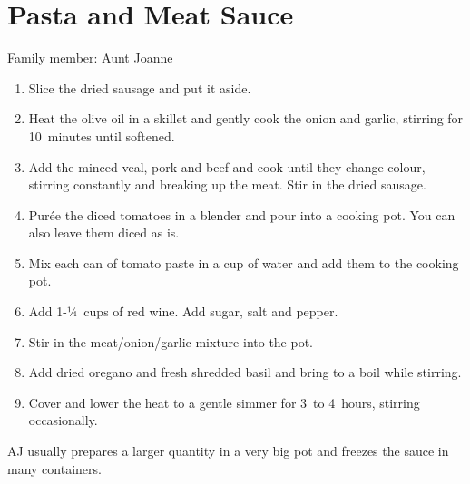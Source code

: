 \chapter{Pasta and Meat Sauce}
\label{ch:pastameatsauce}


Family member: Aunt Joanne

\begin{enumerate}
    \item Slice the dried sausage and put it aside.
    \item Heat the olive oil in a skillet and gently cook the onion and garlic, stirring for 10~minutes until softened.
    \item Add the minced veal, pork and beef and cook until they change colour, stirring constantly and breaking up the meat. Stir in the dried sausage.
    \item Purée the diced tomatoes in a blender and pour into a cooking pot. You can also leave them diced as is.
    \item Mix each can of tomato paste in a cup of water and add them to the cooking pot.
    \item Add 1-¼~cups of red wine. Add sugar, salt and pepper.
    \item Stir in the meat/onion/garlic mixture into the pot.
    \item Add dried oregano and fresh shredded basil and bring to a boil while stirring.
    \item Cover and lower the heat to a gentle simmer for 3~to 4~hours, stirring occasionally.
\end{enumerate}

AJ usually prepares a larger quantity in a very big pot and freezes the sauce in many containers.

